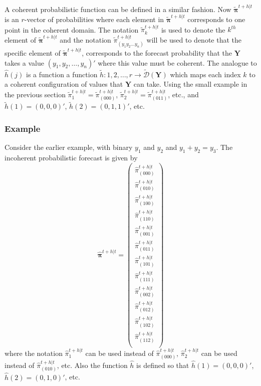 \documentclass[a4paper,review,12pt,authoryear]{elsarticle}
\newcommand{\bY}{\mathbf{Y}}
\newcommand{\bpi}{\bm{\pi}}
\begin{document}
    A coherent probabilistic function can be defined in a similar fashion. Now $\tilde{\bpi}^{t+h|t}$ is an $r$-vector of probabilities where each element in $\tilde{\bpi}^{t+h|t}$ corresponds to one point in the coherent domain. The notation $\tilde{\pi}_k^{t+h|t}$ is used to denote the $k^{th}$ element of $\tilde{\bpi}^{t+h|t}$ and the notation $\tilde{\pi}_{(y_1 y_2 \dots y_n)}^{t+h|t}$ will be used to denote that the specific element of $\tilde{\bpi}^{t+h|t}$, corresponds to the forecast probability that the $\bY$ takes a value $(y_1,y_2,\dots,y_n)'$ where this value must be coherent. The analogue to $\hat{h}(j)$ is a function a function $\tilde{h}:{1,2,\dots,r}\rightarrow\tilde{\mathcal{D}}(\bY)$ which maps each index $k$ to a coherent configuration of values that $\bY$ can take. Using the small example in the previous section $\tilde{\pi}_1^{t+h|t}=\tilde{\pi}_{(000)}^{t+h|t}$, $\tilde{\pi}_2^{t+h|t}=\tilde{\pi}_{(011)}^{t+h|t}$, etc., and $\tilde{h}(1)=(0,0,0)'$, $\tilde{h}(2)=(0,1,1)'$, etc.
    
    \subsubsection*{Example}
    
    Consider the earlier example, with binary $y_1$ and $y_2$ and $y_1+y_2=y_3$. The incoherent probabilistic forecast is given by
    \[
      \hat{\bpi}^{t+h|t}=\begin{pmatrix}
         \hat{\pi}^{t+h|t}_{(000)}\\
         \hat{\pi}^{t+h|t}_{(010)}\\
         \hat{\pi}^{t+h|t}_{(100)}\\
         \hat{\pi}^{t+h|t}_{(110)}\\
         \hat{\pi}^{t+h|t}_{(001)}\\
         \hat{\pi}^{t+h|t}_{(011)}\\
         \hat{\pi}^{t+h|t}_{(101)}\\
         \hat{\pi}^{t+h|t}_{(111)}\\
         \hat{\pi}^{t+h|t}_{(002)}\\
         \hat{\pi}^{t+h|t}_{(012)}\\
         \hat{\pi}^{t+h|t}_{(102)}\\
         \hat{\pi}^{t+h|t}_{(112)}\\
      \end{pmatrix}
    \]
    where the notation $\hat{\pi}^{t+h|t}_{1}$ can be used instead of $\hat{\pi}^{t+h|t}_{(000)}$, $\hat{\pi}^{t+h|t}_{2}$ can be used instead of $\hat{\pi}^{t+h|t}_{(010)}$, etc. Also the function $\hat{h}$ is defined so that $\hat{h}(1)=(0,0,0)'$, $\hat{h}(2)=(0,1,0)'$, etc.
    
\end{document}
